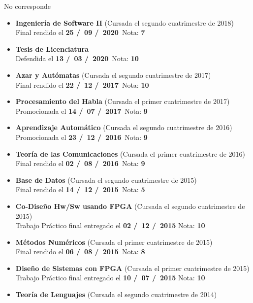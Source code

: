 \ifdefined\JTP No corresponde \else
\begin{itemize}[leftmargin=0.8cm]

\item{\textbf{Ingeniería de Software II} (Cursada el segundo cuatrimestre de 2018)\\
Final rendido el \textbf{25 \slash \ 09 \slash \ 2020}\  \hfill Nota: \textbf{7}}
\item{\textbf{Tesis de Licenciatura} \\
Defendida el \textbf{13 \slash \ 03 \slash \ 2020}\  \hfill Nota: \textbf{10}}
\item{\textbf{Azar y Autómatas} (Cursada el segundo cuatrimestre de 2017)\\
Final rendido el \textbf{22 \slash \ 12 \slash \ 2017}\  \hfill Nota: \textbf{10}}
\item{\textbf{Procesamiento del Habla} (Cursada el primer cuatrimestre de 2017)\\
Promocionada el \textbf{14 \slash \ 07 \slash \ 2017}\  \hfill Nota: \textbf{9}}
\item{\textbf{Aprendizaje Automático} (Cursada el segundo cuatrimestre de 2016)\\
Promocionada el \textbf{23 \slash \ 12 \slash \ 2016}\  \hfill Nota: \textbf{9}}
\item{\textbf{Teoría de las Comunicaciones} (Cursada el primer cuatrimestre de 2016)\\
Final rendido el \textbf{02 \slash \ 08 \slash \ 2016}\  \hfill Nota: \textbf{9}}
\item{\textbf{Base de Datos} (Cursada el segundo cuatrimestre de 2015)\\
Final rendido el \textbf{14 \slash \ 12 \slash \ 2015}\  \hfill Nota: \textbf{5}}
\item{\textbf{Co-Diseño Hw/Sw usando FPGA} (Cursada el segundo cuatrimestre de 2015)\\
Trabajo Práctico final entregado el \textbf{02 \slash \ 12 \slash \ 2015} \hfill Nota: \textbf{10}}
\item{\textbf{Métodos Numéricos} (Cursada el primer cuatrimestre de 2015)\\
Final rendido el \textbf{06 \slash \ 08 \slash \ 2015}\  \hfill Nota: \textbf{8}}
\item{\textbf{Diseño de Sistemas con FPGA} (Cursada el primer cuatrimestre de 2015)\\
Trabajo Práctico final entregado el \textbf{10 \slash \ 07 \slash \ 2015} \hfill Nota: \textbf{10}}
\item{\textbf{Teoría de Lenguajes} (Cursada el segundo cuatrimestre de 2014)\\
}
\end{itemize}
